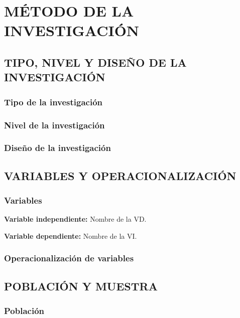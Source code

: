 \chapter{MÉTODO DE LA INVESTIGACIÓN}


\section{TIPO, NIVEL Y DISEÑO DE LA INVESTIGACIÓN}

\subsection{Tipo de la investigación}

\lipsum[1]

\subsection{Nivel de la investigación}

\lipsum[2]

\subsection{Diseño de la investigación}

\lipsum[3]


\section{VARIABLES Y OPERACIONALIZACIÓN}

\subsection{Variables}
\textbf{Variable independiente:}
Nombre de la VD.

\textbf{Variable dependiente:}
Nombre de la VI.

\subsection{Operacionalización de variables}

\lipsum[2]


\section{POBLACIÓN Y MUESTRA}

\subsection{Población}

